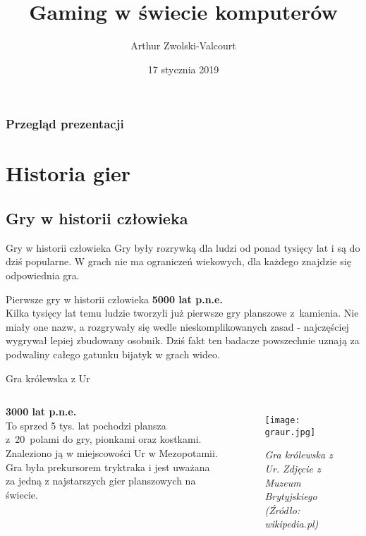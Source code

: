 \documentclass{beamer}
\title[Gaming w świecie komputerów]{Gaming w świecie komputerów}
\author{Arthur Zwolski-Valcourt}
\institute[UJD]
{
Uniwersytet\\Humanistyczno-Przyrodniczy\\im. Jana Długosza w Częstochowie \\
\medskip
}
\date{17 stycznia 2019}
\begin{document}
\begin{frame}
\titlepage
\end{frame}




\begin{frame}
\frametitle{Przegląd prezentacji}
\tableofcontents
\end{frame}


\section{Historia gier}
\subsection{Gry w historii człowieka}

{

\begin{frame}
    \begin{block}{Gry w historii człowieka}
    Gry były rozrywką dla ludzi od ponad tysięcy lat i są do dziś popularne. W grach nie ma ograniczeń wiekowych, dla każdego znajdzie się odpowiednia gra.
    \end{block}
\end{frame}
}

\begin{frame}{Pierwsze gry w historii człowieka}
    \textbf{5000 lat p.n.e.}\\
    Kilka tysięcy lat temu ludzie tworzyli już pierwsze gry planszowe
    z~kamienia. Nie miały one nazw, a rozgrywały się wedle nieskomplikowanych zasad - najczęściej wygrywał lepiej zbudowany osobnik. Dziś fakt ten badacze powszechnie uznają za podwaliny całego gatunku bijatyk w grach wideo.
\end{frame}

\begin{frame}{Gra królewska z Ur}
    \begin{columns}[c]
            \textbf{3000 lat p.n.e.}\\
            To sprzed 5 tys. lat pochodzi plansza
            z~20~polami do gry, pionkami oraz kostkami. Znaleziono ją w miejscowości Ur w Mezopotamii. Gra była prekursorem tryktraka i jest uważana za jedną z najstarszych gier planszowych na świecie.
        \begin{figure}[h]
            \texttt{[image: graur.jpg]}
            \caption{\textit{Gra królewska z Ur. Zdjęcie z Muzeum Brytyjskiego (Źródło: wikipedia.pl)}}
        \end{figure}
    \end{columns}
\end{frame}
\end{document}
